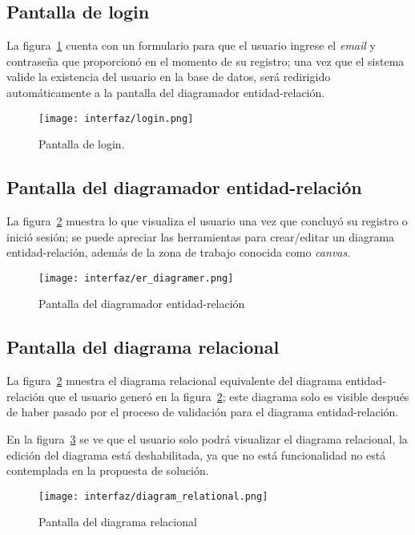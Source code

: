 \subsection*{Pantalla de login}

La figura~\ref{img:app_login} cuenta con un formulario para que el usuario ingrese el \textit{email} y contraseña que proporcionó en el momento de su registro; una vez que el sistema valide la existencia del usuario en la base de datos, será redirigido automáticamente a la pantalla del diagramador entidad-relación.

\begin{figure}[H]
    \centering
    \texttt{[image: interfaz/login.png]}
    \caption{Pantalla de login.}
    \label{img:app_login}
\end{figure}


\subsection*{Pantalla del diagramador entidad-relación}

La figura~\ref{img:app_diagrammerER} muestra lo que visualiza el usuario una vez que concluyó su registro o inició sesión; se puede apreciar las herramientas para crear/editar un diagrama entidad-relación, además de la zona de trabajo conocida como \textit{canvas}.

\begin{figure}[H]
    \centering
    \texttt{[image: interfaz/er\_diagramer.png]}
    \caption{Pantalla del diagramador entidad-relación}
    \label{img:app_diagrammerER}
\end{figure}

\subsection*{Pantalla del diagrama relacional}

La figura~\ref{img:app_diagrammerER} muestra el diagrama relacional equivalente del diagrama entidad-relación que el usuario generó en la figura~\ref{img:app_diagrammerER}; este diagrama solo es visible después de haber pasado por el proceso de validación para el diagrama entidad-relación.


En la figura~\ref{img:app_diagrammerRelational} se ve que el usuario solo podrá visualizar el diagrama relacional, la edición del diagrama está deshabilitada, ya que no está funcionalidad no está contemplada en la propuesta de solución.

\begin{figure}[H]
    \centering
    \texttt{[image: interfaz/diagram\_relational.png]}
    \caption{Pantalla del diagrama relacional}
    \label{img:app_diagrammerRelational}
\end{figure}

